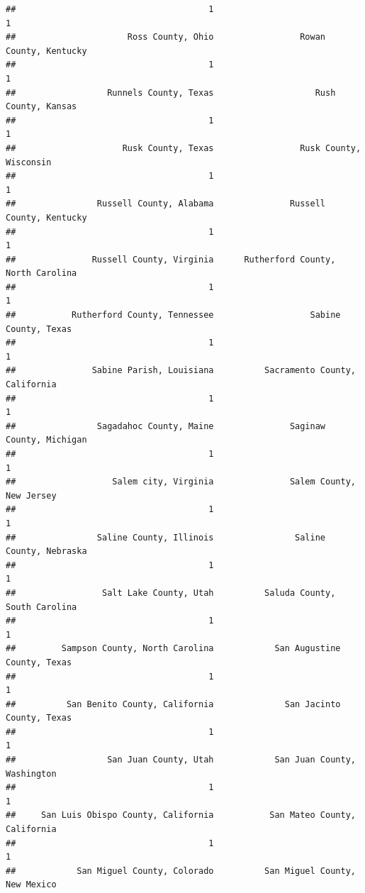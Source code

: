 \documentclass[
]{article}
\begin{document}
\begin{verbatim}
##                                      1                                      1 
##                      Ross County, Ohio                 Rowan County, Kentucky 
##                                      1                                      1 
##                  Runnels County, Texas                    Rush County, Kansas 
##                                      1                                      1 
##                     Rusk County, Texas                 Rusk County, Wisconsin 
##                                      1                                      1 
##                Russell County, Alabama               Russell County, Kentucky 
##                                      1                                      1 
##               Russell County, Virginia      Rutherford County, North Carolina 
##                                      1                                      1 
##           Rutherford County, Tennessee                   Sabine County, Texas 
##                                      1                                      1 
##               Sabine Parish, Louisiana          Sacramento County, California 
##                                      1                                      1 
##                Sagadahoc County, Maine               Saginaw County, Michigan 
##                                      1                                      1 
##                   Salem city, Virginia               Salem County, New Jersey 
##                                      1                                      1 
##                Saline County, Illinois                Saline County, Nebraska 
##                                      1                                      1 
##                 Salt Lake County, Utah          Saluda County, South Carolina 
##                                      1                                      1 
##         Sampson County, North Carolina            San Augustine County, Texas 
##                                      1                                      1 
##          San Benito County, California              San Jacinto County, Texas 
##                                      1                                      1 
##                  San Juan County, Utah            San Juan County, Washington 
##                                      1                                      1 
##     San Luis Obispo County, California           San Mateo County, California 
##                                      1                                      1 
##            San Miguel County, Colorado          San Miguel County, New Mexico 

\end{verbatim}
\end{document}
